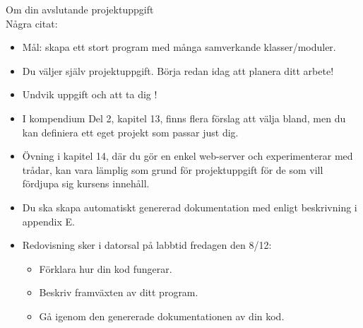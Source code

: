 




\begin{Slide}{Om din avslutande projektuppgift}\SlideFontSmall
{} \\
Några citat:
\begin{itemize}
\item Mål: skapa ett stort program med många samverkande klasser/moduler.
\item Du väljer själv projektuppgift. Börja redan idag att planera ditt arbete!
\item Undvik  uppgift och att ta dig !

\item I kompendium Del 2, kapitel 13, finns flera förslag att välja bland, men du kan  definiera ett eget projekt som passar just dig.

\item Övning  i kapitel 14, där du gör en enkel web-server och experimenterar med trådar, kan vara lämplig som grund för projektuppgift för de som vill fördjupa sig  kursens innehåll.

\item Du ska skapa automatiskt genererad dokumentation med  enligt beskrivning i appendix E.

\item Redovisning sker i datorsal på labbtid fredagen den 8/12:
\begin{itemize}\SlideFontTiny
  \item Förklara hur din kod fungerar.
  \item Beskriv framväxten av ditt program.
  \item Gå igenom den genererade dokumentationen av din kod.
\end{itemize}
\end{itemize}

\end{Slide}


